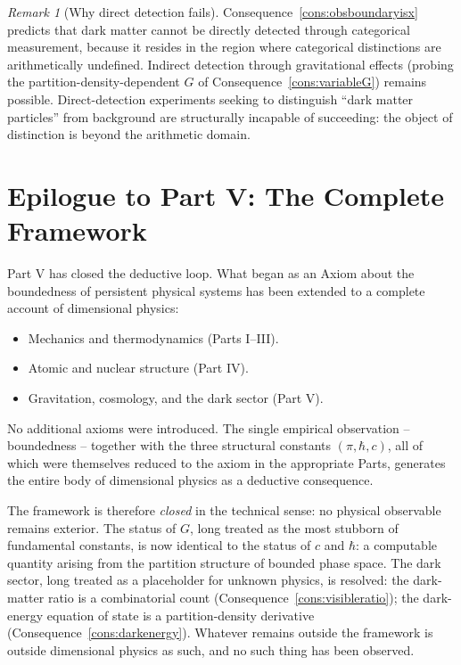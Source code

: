 \documentclass[11pt,twocolumn,a4paper]{article}
\theoremstyle{axiomstyle}
\theoremstyle{conseqstyle}
\theoremstyle{definition}
\theoremstyle{remark}
\newtheorem*{remark}{Remark}
\begin{document}
\begin{remark}[Why direct detection fails]
Consequence~\ref{cons:obsboundaryisx} predicts that dark matter cannot be directly detected through categorical measurement, because it resides in the region where categorical distinctions are arithmetically undefined. Indirect detection through gravitational effects (probing the partition-density-dependent $G$ of Consequence~\ref{cons:variableG}) remains possible. Direct-detection experiments seeking to distinguish ``dark matter particles'' from background are structurally incapable of succeeding: the object of distinction is beyond the arithmetic domain.
\end{remark}

\section*{Epilogue to Part V: The Complete Framework}

Part V has closed the deductive loop. What began as an Axiom about the boundedness of persistent physical systems has been extended to a complete account of dimensional physics:
\begin{itemize}[nosep]
\item Mechanics and thermodynamics (Parts I--III).
\item Atomic and nuclear structure (Part IV).
\item Gravitation, cosmology, and the dark sector (Part V).
\end{itemize}
No additional axioms were introduced. The single empirical observation -- boundedness -- together with the three structural constants $(\pi,\hbar,c)$, all of which were themselves reduced to the axiom in the appropriate Parts, generates the entire body of dimensional physics as a deductive consequence.

The framework is therefore \emph{closed} in the technical sense: no physical observable remains exterior. The status of $G$, long treated as the most stubborn of fundamental constants, is now identical to the status of $c$ and $\hbar$: a computable quantity arising from the partition structure of bounded phase space. The dark sector, long treated as a placeholder for unknown physics, is resolved: the dark-matter ratio is a combinatorial count (Consequence~\ref{cons:visibleratio}); the dark-energy equation of state is a partition-density derivative (Consequence~\ref{cons:darkenergy}). Whatever remains outside the framework is outside dimensional physics as such, and no such thing has been observed.
\end{document}
